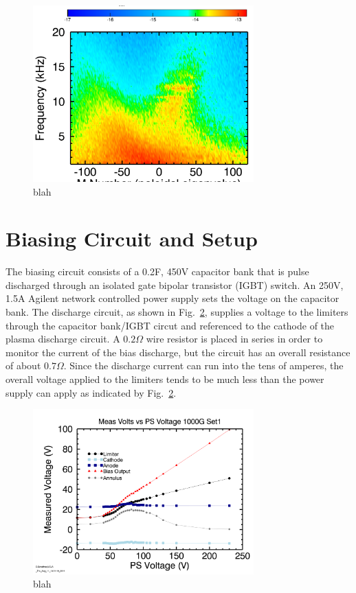 \documentclass[aip,pop,amsmath,amssymb,preprint,superscriptaddress]{revtex4-1} %
\begin{document}
\begin{figure}[!htbp]
\centerline{
\includegraphics[width=8.5cm]{m_spec_vs_freq}}
\caption{\label{fig:m_spec_vs_freq} blah}
\end{figure}



\section{Biasing Circuit and Setup}

The biasing circuit consists of a 0.2F, 450V capacitor bank that is pulse discharged through an isolated gate bipolar transistor (IGBT) switch. An 250V, 1.5A Agilent network controlled power supply sets the voltage on the capacitor bank. The discharge circuit, as shown in Fig.~\ref{fig:VbyBias}, supplies a voltage to the limiters through the capacitor bank/IGBT circut and referenced to the cathode of the plasma discharge circuit. A $0.2 \Omega$ wire resistor is placed in series in order to monitor the current of the bias discharge, but the circuit has an overall resistance of about $0.7 \Omega$. Since the discharge current can run into the tens of amperes, the overall voltage applied to the limiters tends to be much less than the power supply can apply as indicated by Fig.~\ref{fig:VbyBias}. 

\begin{figure}[!htbp]
\centerline{
\includegraphics[width=8.5cm]{VbyBias}}
\caption{\label{fig:VbyBias} blah}
\end{figure}
\end{document}
